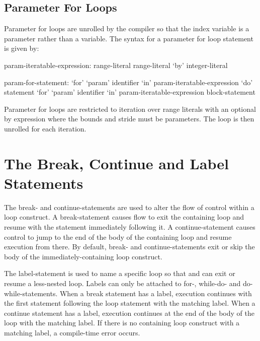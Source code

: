 \subsection{Parameter For Loops}
\label{Parameter_For_Loops}

Parameter for loops are unrolled by the compiler so that the index
variable is a parameter rather than a variable.  The syntax for a
parameter for loop statement is given by:
\begin{syntax}
param-iteratable-expression:
  range-literal
  range-literal `by' integer-literal

param-for-statement:
  `for' `param' identifier `in' param-iteratable-expression `do' statement
  `for' `param' identifier `in' param-iteratable-expression block-statement
\end{syntax}
Parameter for loops are restricted to iteration over range literals
with an optional by expression where the bounds and stride must be
parameters.  The loop is then unrolled for each iteration.

\section{The Break, Continue and Label Statements}
\label{Label_Break_Continue}

The break- and continue-statements are used to alter the flow of control within a
loop construct.  A break-statement causes flow to exit the containing loop and
resume with the statement immediately following it.  A continue-statement causes
control to jump to the end of the body of the containing loop and resume
execution from there.  By default, break- and continue-statements exit
or skip the body of the immediately-containing loop construct.

The label-statement is used to name a specific loop so that 
and  can exit or resume a less-nested loop.
Labels can only be attached to for-, while-do- and do-while-statements.
When a break statement has a label, execution continues with the first statement
following the loop statement with the matching label.  When a continue statement
has a label, execution continues at the end of the body of the loop with the
matching label.  If there is no containing loop construct with a matching label,
a compile-time error occurs.

